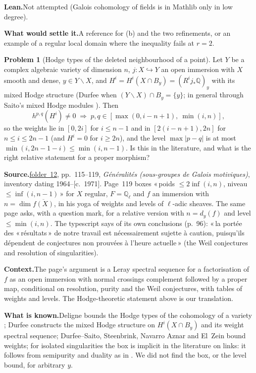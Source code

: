 \documentclass[11pt]{article}
\newcommand{\q}[1]{«\,#1\,»}
\newcommand{\fac}[1]{\href{https://grothendieck.umontpellier.fr/#1.pdf}{folder~#1}}
\theoremstyle{definition}
\newtheorem{problem}{Problem}
\theoremstyle{plain}\newtheorem*{proposition}{Proposition}\theoremstyle{definition}
\newcommand{\entry}[1]{\par\medskip\noindent\textbf{#1}\enspace}
\newcommand{\src}[1]{\entry{Source.}#1}
\newcommand{\ctx}{\entry{Context.}}
\newcommand{\known}{\entry{What is known.}}
\newcommand{\leanst}{\entry{Lean.}}
\newcommand{\settle}{\entry{What would settle it.}}
\begin{document}
\leanst Not attempted (Galois cohomology of fields is in Mathlib only in low degree).

\settle A reference for (b) and the two refinements, or an example of a regular local domain where the inequality fails at $r = 2$.

\begin{problem}[Hodge types of the deleted neighbourhood of a point]\label{p:box}
Let $Y$ be a complex algebraic variety of dimension $n$, $j : X \hookrightarrow Y$ an open immersion with $X$ smooth and dense, $y \in Y \smallsetminus X$, and $H^i = H^i(X \cap B_y) = (R^i j_*\mathbb Q)_y$ with its mixed Hodge structure (Durfee \cite{durfee} when $(Y \smallsetminus X) \cap B_y = \{y\}$; in general through Saito's mixed Hodge modules \cite{saito}). Then
\[
h^{p,q}(H^i) \ne 0 \;\Longrightarrow\; p, q \in [\max(0, i-n+1),\ \min(i, n)],
\]
so the weights lie in $[0, 2i]$ for $i \le n-1$ and in $[2(i-n+1), 2n]$ for $n \le i \le 2n-1$ (and $H^i = 0$ for $i \ge 2n$), and the level $\max|p-q|$ is at most $\min(i, 2n-1-i) \le \min(i, n-1)$. Is this in the literature, and what is the right relative statement for a proper morphism?
\end{problem}

\src{\fac{12}, pp.~115--119, \emph{Généralités (sous-groupes de Galois motiviques)}, inventory dating 1964--[c.~1971]. Page~119 boxes \q{poids $\le 2\inf(i,n)$, niveau $\le \inf(i, n-1)$} for $X$ regular, $F = \mathbb Q_\ell$ and $f$ an immersion with $n = \dim \overline{f(X)}$, in his yoga of weights and levels of $\ell$-adic sheaves. The same page asks, with a question mark, for a relative version with $n = d_y(f)$ and level $\le \min(i,n)$. The typescript says of its own conclusions (p.~96): \q{la portée des \q{résultats} de notre travail est nécessairement sujette à caution, puisqu'ils dépendent de conjectures non prouvées à l'heure actuelle} (the Weil conjectures and resolution of singularities).}

\ctx The page's argument is a Leray spectral sequence for a factorisation of $f$ as an open immersion with normal crossings complement followed by a proper map, conditional on resolution, purity and the Weil conjectures, with tables of weights and levels. The Hodge-theoretic statement above is our translation.

\known Deligne bounds the Hodge types of the cohomology of a variety \cite[8.2.4]{hodge3}; Durfee constructs the mixed Hodge structure on $H^i(X \cap B_y)$ and its weight spectral sequence; Durfee--Saito, Steenbrink, Navarro Aznar and El~Zein bound weights; for isolated singularities the box is implicit in the literature on links: it follows from semipurity and duality as in \cite[Th.~2.6, Def.~2.7]{friedmanlaza}. We did not find the box, or the level bound, for arbitrary $y$.
\end{document}
